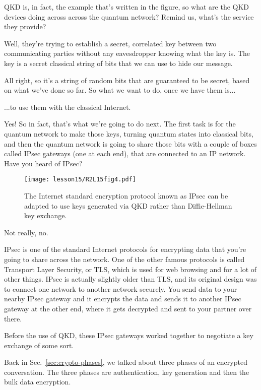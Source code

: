 \rrr QKD is, in fact, the example that's written in the figure, so what are the QKD devices doing across across the quantum network? Remind us, what's the service they provide?

\mmm Well, they're trying to establish a secret, correlated key between two communicating parties without any eavesdropper knowing what the key is. The key is a secret classical string of bits that we can use to hide our message.

\rrr All right, so it's a string of random bits that are guaranteed to be secret, based on what we've done so far. So what we want to do, once we have them is...

\mmm ...to use them with the classical Internet.

\rrr Yes! So in fact, that's what we're going to do next. The first task is for the quantum network to make those keys, turning quantum states into classical bits, and then the quantum network is going to share those bits with a couple of boxes called IPsec gateways (one at each end), that are connected to an IP network. Have you heard of IPsec?

\begin{figure}[t]
    \centering
    \texttt{[image: lesson15/R2L15fig4.pdf]}
    \caption[IPsec with QKD]{The Internet standard encryption protocol known as IPsec can be adapted to use keys generated via QKD rather than Diffie-Hellman key exchange.}
    \label{fig:15-4-ipsec-with-qkd}
\end{figure}

\mmm Not really, no.

\rrr IPsec is one of the standard Internet protocols for encrypting data that you're going to share across the network. One of the other famous protocols is called Transport Layer Security, or TLS, which is used for web browsing and for a lot of other things. IPsec is actually slightly older than TLS, and its original design was to connect one network to another network securely. You send data to your nearby IPsec gateway and it encrypts the data and sends it to another IPsec gateway at the other end, where it gets decrypted and sent to your partner over there.

Before the use of QKD, these IPsec gateways worked together to negotiate a key exchange of some sort.

\mmm Back in Sec.~\ref{sec:crypto-phases}, we talked about three phases of an encrypted conversation. The three phases are authentication, key generation and then the bulk data encryption.

